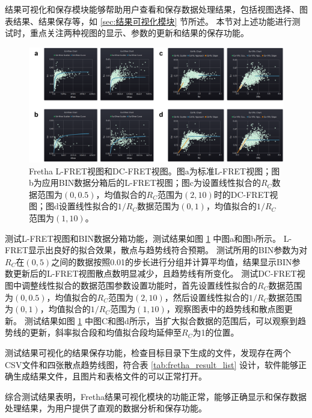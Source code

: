 结果可视化和保存模块能够帮助用户查看和保存数据处理结果，包括视图选择、图表结果、结果保存等，如 \ref{sec:结果可视化模块} 节所述。
本节对上述功能进行测试时，重点关注两种视图的显示、参数的更新和结果的保存功能。
\begin{figure}[htbp]
  \centering
  \includegraphics[width=1\linewidth]{../figures/3/测试-结果可视化.drawio.png}
  \caption[Fretha L-FRET和DC-FRET视图测试结果]{Fretha L-FRET视图和DC-FRET视图。图a为标准L-FRET视图；图b为应用BIN数据分箱后的L-FRET视图；图c为设置线性拟合的$R_C$数据范围为$(0,0.5)$，均值拟合的$R_C$范围为$(2,10)$时的DC-FRET视图；图d设置线性拟合的$1/R_C$数据范围为$(0,1)$，均值拟合的$1/R_C$范围为$(1,10)$。}
  \label{fig:L-FRET视图测试}
\end{figure}

测试L-FRET视图和BIN数据分箱功能，测试结果如图 \ref{fig:L-FRET视图测试} 中图a和图b所示。
L-FRET显示出良好的拟合效果，散点与趋势线符合预期。
测试所用的BIN参数为对$R_C$在$(0,5)$之间的数据按照0.01的步长进行分组并计算平均值，结果显示BIN参数更新后的L-FRET视图散点数明显减少，且趋势线有所变化。
测试DC-FRET视图中调整线性拟合的数据范围参数设置功能时，首先设置线性拟合的$R_C$数据范围为$(0,0.5)$，均值拟合的$R_C$范围为$(2,10)$，然后设置线性拟合的$1/R_C$数据范围为$(0,1)$，均值拟合的$1/R_C$范围为$(1,10)$，观察图表中的趋势线和散点图更新。
测试结果如图 \ref{fig:L-FRET视图测试} 中图C和图d所示，当扩大拟合数据的范围后，可以观察到趋势线的更新，斜率拟合段和均值拟合段均延伸至$R_C$为1的位置。

测试结果可视化的结果保存功能，检查目标目录下生成的文件，发现存在两个CSV文件和四张散点趋势线图，符合表 \ref{tab:fretha_result_list} 设计，软件能够正确生成结果文件，且图片和表格文件的可以正常打开。

综合测试结果表明，Fretha结果可视化模块的功能正常，能够正确显示和保存数据处理结果，为用户提供了直观的数据分析和保存功能。


